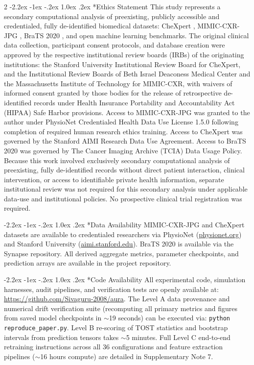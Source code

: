 \documentclass[10pt,a4paper,twoside]{article}
\makeatletter
\renewcommand{\section}{\@startsection{section}{1}{\z@}%
  {-2.2ex \@plus -1ex \@minus -.2ex}%
  {1.0ex \@plus.2ex}%
  {\normalfont\large\sffamily\bfseries\color{naturedark}}}
\makeatother
\begin{document}
\begin{multicols}{2}
\section*{Ethics Statement}
This study represents a secondary computational analysis of preexisting, publicly accessible and credentialed, fully de-identified biomedical datasets: CheXpert \cite{irvin2019}, MIMIC-CXR-JPG \cite{johnson2019}, BraTS 2020 \cite{bakas2017}, and open machine learning benchmarks. The original clinical data collection, participant consent protocols, and database creation were approved by the respective institutional review boards (IRBs) of the originating institutions: the Stanford University Institutional Review Board for CheXpert, and the Institutional Review Boards of Beth Israel Deaconess Medical Center and the Massachusetts Institute of Technology for MIMIC-CXR, with waivers of informed consent granted by those bodies for the release of retrospective de-identified records under Health Insurance Portability and Accountability Act (HIPAA) Safe Harbor provisions. Access to MIMIC-CXR-JPG was granted to the author under PhysioNet Credentialed Health Data Use License 1.5.0 following completion of required human research ethics training. Access to CheXpert was governed by the Stanford AIMI Research Data Use Agreement. Access to BraTS 2020 was governed by The Cancer Imaging Archive (TCIA) Data Usage Policy. Because this work involved exclusively secondary computational analysis of preexisting, fully de-identified records without direct patient interaction, clinical intervention, or access to identifiable private health information, separate institutional review was not required for this secondary analysis under applicable data-use and institutional policies. No prospective clinical trial registration was required.

\section*{Data Availability}
MIMIC-CXR-JPG and CheXpert datasets are available to credentialed researchers via PhysioNet (\url{physionet.org}) and Stanford University (\url{aimi.stanford.edu}). BraTS 2020 is available via the Synapse repository. All derived aggregate metrics, parameter checkpoints, and prediction arrays are available in the project repository.

\section*{Code Availability}
All experimental code, simulation harnesses, audit pipelines, and verification tests are openly available at: \url{https://github.com/Sivaguru-2008/aura}. The Level A data provenance and numerical drift verification suite (recomputing all primary metrics and figures from saved model checkpoints in $\sim$19 seconds) can be executed via: \texttt{python reproduce\_paper.py}. Level B re-scoring of TOST statistics and bootstrap intervals from prediction tensors takes $\sim$5 minutes. Full Level C end-to-end retraining instructions across all 36 configurations and feature extraction pipelines ($\sim$16 hours compute) are detailed in Supplementary Note 7.


\end{multicols}
\end{document}
